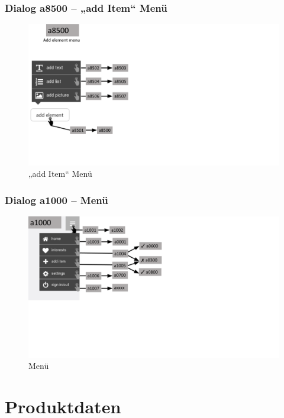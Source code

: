 \documentclass[a4paper,12pt,oneside]{scrartcl}
\begin{document}
\subsubsection{Dialog a8500 – „add Item“ Menü}
\begin{figure}[!htbp]
\centering
\noindent\includegraphics[width=\linewidth,height=\textheight,keepaspectratio]{Dialoge/a8500}
\caption{„add Item“ Menü}
\end{figure}
\FloatBarrier

\subsubsection{Dialog a1000 – Menü}
\begin{figure}[!htbp]
\centering
\noindent\includegraphics[width=\linewidth,height=\textheight,keepaspectratio]{Dialoge/a1000}
\caption{Menü}
\end{figure}
\FloatBarrier


\section{Produktdaten}
\end{document}
